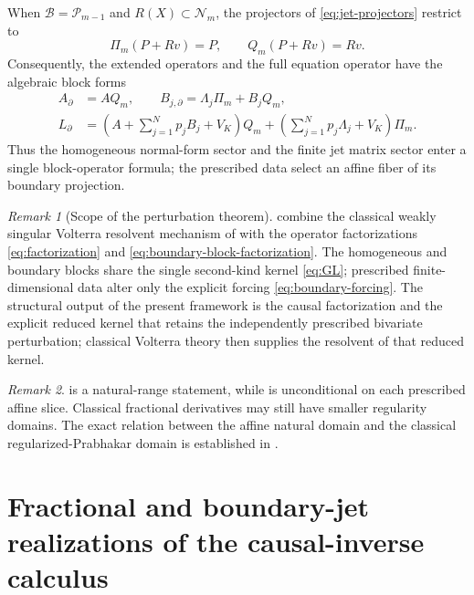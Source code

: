 \documentclass[11pt]{article}
\numberwithin{equation}{section}
\theoremstyle{definition}
\theoremstyle{remark}
\newtheorem{remark}{Remark}
\begin{document}
When $\mathcal B=\mathcal P_{m-1}$ and $R(X)\subset\mathcal N_m$, the projectors of \eqref{eq:jet-projectors} restrict to
\begin{equation*}
\Pi_m(P+Rv)=P,
\qquad
Q_m(P+Rv)=Rv.
\end{equation*}
Consequently, the extended operators and the full equation operator have the algebraic block forms
\begin{align}
A_\partial&=AQ_m,
\qquad B_{j,\partial}=\Lambda_j\Pi_m+B_jQ_m,
\label{eq:boundary-operator-blocks}\\
L_\partial
&=\left(A+\sum_{j=1}^{N}p_jB_j+V_K\right)Q_m
+\left(\sum_{j=1}^{N}p_j\Lambda_j+V_K\right)\Pi_m.
\label{eq:augmented-operator-form}
\end{align}
Thus the homogeneous normal-form sector and the finite jet matrix sector enter a single block-operator formula; the prescribed data select an affine fiber of its boundary projection.

\begin{remark}[Scope of the perturbation theorem]
 combine the classical weakly singular Volterra resolvent mechanism of  with the operator factorizations \eqref{eq:factorization} and \eqref{eq:boundary-block-factorization}. The homogeneous and boundary blocks share the single second-kind kernel \eqref{eq:GL}; prescribed finite-dimensional data alter only the explicit forcing \eqref{eq:boundary-forcing}.
The structural output of the present framework is the causal factorization and the explicit reduced kernel that retains the independently prescribed bivariate perturbation; classical Volterra theory then supplies the resolvent of that reduced kernel.
\end{remark}

\begin{remark}
 is a natural-range statement, while  is unconditional on each prescribed affine slice. Classical fractional derivatives may still have smaller regularity domains. The exact relation between the affine natural domain and the classical regularized-Prabhakar domain is established in .
\end{remark}

\section{Fractional and boundary-jet realizations of the causal-inverse calculus}
\end{document}
